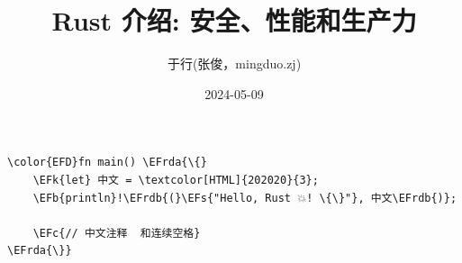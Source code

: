 \documentclass[lang=cn,11pt,a4paper,table,fontset=none]{ctexart}
\author{于行(张俊，mingduo.zj)}
\date{2024-05-09}
\title{Rust 介绍: 安全、性能和生产力}
\newcommand{\EFc}[1]{\textcolor{EFc}{\textit{#1}}} %
\newcommand{\EFs}[1]{\textcolor{EFs}{#1}} %
\newcommand{\EFk}[1]{\textcolor{EFk}{\textbf{#1}}} %
\newcommand{\EFb}[1]{\textcolor{EFb}{\textbf{#1}}} %
\newcommand{\EFrda}[1]{\textcolor{EFrda}{#1}} %
\newcommand{\EFrdb}[1]{\textcolor{EFrdb}{#1}} %
\begin{document}
\begin{Code}
\begin{Verbatim}
\color{EFD}fn main() \EFrda{\{}
    \EFk{let} 中文 = \textcolor[HTML]{202020}{3};
    \EFb{println}!\EFrdb{(}\EFs{"Hello, Rust 💥! \{\}"}, 中文\EFrdb{)};

    \EFc{// 中文注释  和连续空格}
\EFrda{\}}
\end{Verbatim}
\end{Code}
\end{document}
